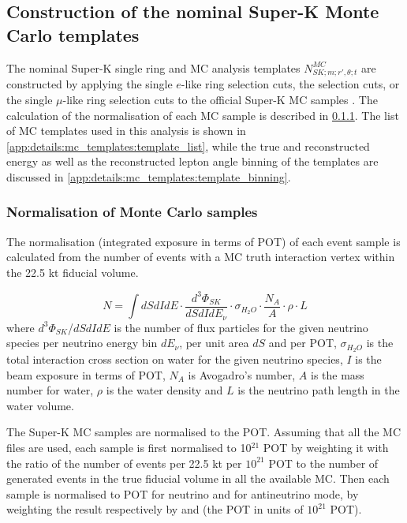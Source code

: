 \subsection {Construction of the nominal Super-K Monte Carlo templates}
\label{app:details:mc_templates}

The nominal Super-K single ring and \nueCConepi{} MC analysis templates $N_{SK;m;r\prime,\theta;t}^{MC}$ are constructed by applying the single $e$-like ring selection cuts, the \nueCConepi{} selection cuts, or the single $\mu$-like ring selection cuts to the official Super-K MC samples \cite{Superk_run8}. The calculation of the normalisation of each MC sample is described in \cref{app:details:mc_templates:normalization}. The list of MC templates used in this analysis is shown in \cref{app:details:mc_templates:template_list}, while the true and reconstructed energy as well as the reconstructed lepton angle binning of the templates are discussed in \cref{app:details:mc_templates:template_binning}.

\subsubsection {Normalisation of Monte Carlo samples}
\label{app:details:mc_templates:normalization}

The normalisation (integrated exposure in terms of POT) of each event sample is calculated from the number of events with a MC truth interaction vertex within the 22.5 kt fiducial volume.

\begin{equation}
\displaystyle
  N = \int  dS dI dE \cdot
            \frac{d^{3}\Phi_{SK}}{dS dI dE_{\nu}} \cdot
            \sigma_{H_{2}O} \cdot
            \frac{N_{A}}{A} \cdot \rho \cdot L 
\end{equation}
where $d^{3}\Phi_{SK}$/$dS dI dE$ is the number of flux particles for the given neutrino species per neutrino energy bin $dE_{\nu}$, per unit area $dS$ and per POT, $\sigma_{H_{2}O}$ is the total interaction cross section on water for the given neutrino species, $I$ is the beam exposure in terms of POT, $N_{A}$ is  Avogadro's number, $A$ is the mass number for water, $\rho$ is the water density and $L$ is the neutrino path length in the water volume.

The Super-K MC samples are normalised to the \RunPeriod POT. Assuming that all the MC files are used, each sample is first normalised to 10$^{21}$ POT by weighting it with the ratio of the number of events per 22.5 kt per $10^{21}$ POT to the number of generated events in the true fiducial volume in all the available MC. Then each sample is normalised to \TotalPotNuRunOneEight{} POT for neutrino and \TotalPotNuBarRunOneEight{} for antineutrino mode, by weighting the result respectively by \TotalPotPerTwentyOneNu{} and \TotalPotPerTwentyOneNuBar{} (the \RunPeriod POT in units of $10^{21}$ POT). 


